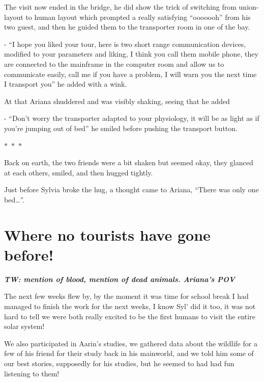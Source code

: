 \documentclass[hidelinks,12pt,a4paper]{book}
\newcommand\sep{\begin{center}
  \boldmath $\ast$~$\ast$~$\ast$
\end{center}}
\begin{document}
The visit now ended in the bridge, he did show the trick of switching from union-layout to human layout which prompted 
a really satisfying “ooooooh” from his two guest, and then he guided them to the transporter room in one of the bay.\par
\bigskip

- “I hope you liked your tour, here is two short range communication devices, modified to your parameters and 
liking, I think you call them mobile phone, they are connected to the mainframe in the computer room and allow us 
to communicate easily, call me if you have a problem, I will warn you the next time I transport you” he added with a wink.\par
\bigskip

At that Ariana shuddered and was visibly shaking, seeing that he added\par
\bigskip

- “Don't worry the transporter adapted to your physiology, it will be as light as if you're jumping out of bed” 
he smiled before pushing the transport button.

\sep

Back on earth, the two friends were a bit shaken but seemed okay, they glanced at each others, smiled, and then 
hugged tightly.\par
\bigskip

Just before Sylvia broke the hug, a thought came to Ariana, “There was only one bed…”.

\chapter{Where no tourists have gone before!}

\textit{\textbf{TW: mention of blood, mention of dead animals. Ariana's POV}}\par
\bigskip

The next few weeks flew by, by the moment it was time for school break I had managed to finish the work for the next weeks, 
I know Syl' did it too, it was not hard to tell we were both really excited to be the first humans to visit the entire 
solar system!\par
\bigskip

We also participated in Aarin's studies, we gathered data about the wildlife for a few of his friend for their study 
back in his mainworld, and we told him some of our best stories, supposedly for his studies, but he seemed to had had 
fun listening to them!\par
\bigskip
\end{document}
